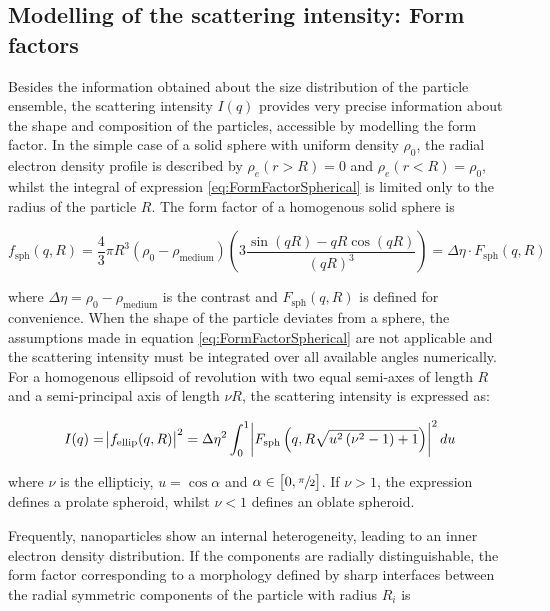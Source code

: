 \subsection{Modelling of the scattering intensity: Form factors}

Besides the information obtained about the size distribution of the particle ensemble, the scattering intensity $I(q)$ provides very precise information about the shape and composition of the particles, accessible by modelling the form factor. In the simple case of a solid sphere with uniform density $\rho_0$, the radial electron density profile is described by $\rho_e(r>R)=0$ and $\rho_e(r<R)=\rho_0$, whilst the integral of expression \ref{eq:FormFactorSpherical} is limited only to the radius of the particle $R$. The form factor of a homogenous solid sphere is 

\begin{equation}
        \label{eq:ff_sphere}
       f_{\text{sph}}(q,R)=\frac{4}{3}\pi R^3 \left( \rho_0 - \rho_{\text{medium}} \right) \left( 3\frac{\sin(qR)-qR\cos(qR)}{\left( qR \right)^3} \right) = \Delta \eta \cdot F_{\text{sph}}(q,R)
\end{equation}

where $\Delta \eta = \rho_0 - \rho_{\text{medium}}$ is the contrast and $ F_{\text{sph}}(q,R)$ is defined for convenience. When the shape of the particle deviates from a sphere, the assumptions made in equation \ref{eq:FormFactorSpherical} are not applicable and the scattering intensity must be integrated over all available angles numerically. For a homogenous ellipsoid of revolution with two equal semi-axes of length $R$ and a semi-principal axis of length $\nu R $, the scattering intensity is expressed as:

\begin{equation}
        \label{eq:ff_ellipsoid}
       I(q) = \abs{ f_{\text{ellip}}(q,R) }^2 = \Delta \eta^2 \int_0^1 \abs{F_{\text{sph}}\left( q,R \sqrt{u^2\left( \nu^2 -1 \right) + 1} \right)}^2 du 
\end{equation}

where $\nu$ is the ellipticiy, $u = \cos{\alpha}$ and $\alpha \in \left[  0, \sfrac{\pi}{2} \right]$. If $\nu > 1$, the expression defines a prolate spheroid, whilst $\nu < 1$ defines an oblate spheroid.

Frequently, nanoparticles show an internal heterogeneity, leading to an inner electron density distribution. If the components are radially distinguishable, the form factor corresponding to a morphology defined by sharp interfaces between the radial symmetric components of the particle with radius \(R_i\) is

